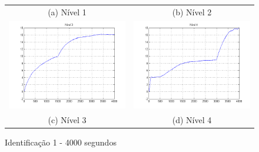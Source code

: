 \begin{figure}[H]
\begin{tabular}{cc}
		(a) Nível 1 &
		(b) Nível 2 \\
		\includegraphics[height=0.15\paperheight,keepaspectratio]{img/sim1_h3.png} &
		\includegraphics[height=0.15\paperheight,keepaspectratio]{img/sim1_h4.png} \\
		(c) Nível 3 &
		(d) Nível 4
	\end{tabular}
	\caption{\label{imgID_4000} Identificação 1 - 4000 segundos}
\end{figure}

